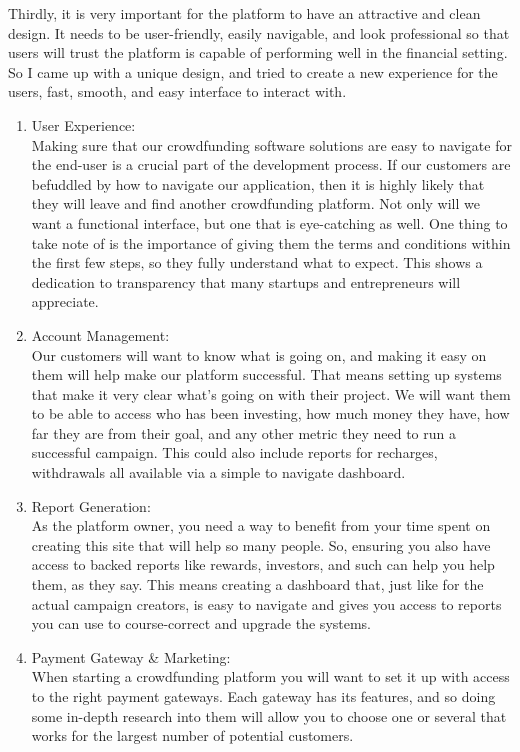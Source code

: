 Thirdly, it is very important for the platform to have an attractive and clean design. It needs to be user-friendly, easily navigable, and look professional so that users will trust the platform is capable of performing
well in the financial setting. So I came up with a unique design, and tried to create a new experience for the users, fast,
smooth, and easy interface to interact with.
\begin{enumerate}
      \item
            User Experience:\\

            Making sure that our crowdfunding software solutions are easy to navigate for the end-user is a crucial part of the development process. If our customers are befuddled by how to navigate our application, then it is highly likely that they will leave and find another crowdfunding platform. Not only will we want a functional interface, but one that is eye-catching as well.
            One thing to take note of is the importance of giving them the terms and conditions within the first few steps, so they fully understand what to expect. This shows a dedication to transparency that many startups and entrepreneurs will appreciate.

      \item
            Account Management:\\

            Our customers will want to know what is going on, and making it easy on them will help make our platform successful. That means setting up systems that make it very clear what’s going on with their project. We will want them to be able to access who has been investing, how much money they have, how far they are from their goal, and any other metric they need to run a successful campaign. This could also include reports for recharges, withdrawals all available via a simple to navigate dashboard.
      \item

            Report Generation:\\
            As the platform owner, you need a way to benefit from your time spent on creating this site that will help so many people. So, ensuring you also have access to backed reports like rewards, investors, and such can help you help them, as they say. This means creating a dashboard that, just like for the actual campaign creators, is easy to navigate and gives you access to reports you can use to course-correct and upgrade the systems.
      \item
            Payment Gateway \& Marketing:\\

            When starting a crowdfunding platform you will want to set it up with access to the right payment gateways. Each gateway has its features, and so doing some in-depth research into them will allow you to choose one or several that works for the largest number of potential customers.
\end{enumerate}



